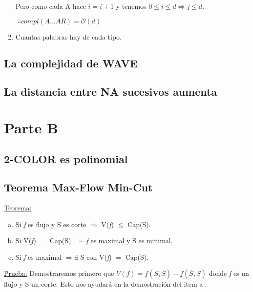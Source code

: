 \documentclass[12pt,a4paper]{report}
\begin{document}
\begin{enumerate}
		Pero como cada A hace $ i = i+1$ y tenemos $ 0 \leq \textit{i} \leq \textit{d} \Rightarrow \textit{j} \leq \textit{d}.$
		
		\begin{center}
			$ \; \therefore compl(A...AR) = \mathcal{O}(\textit{d})$
		\end{center}			
			

			\item Cuantas palabras hay de cada tipo.
			
				
		\end{enumerate}
		
		
		
		
		
		
		
	\section{La complejidad de WAVE}

	
	\section{La distancia entre NA sucesivos aumenta}
	


\chapter{Parte B}

	\section{2-COLOR es polinomial}
	
	
	\section{Teorema Max-Flow Min-Cut}
		\underline{Teorema:}
		\begin{enumerate}[a)]
			\item Si \textit{f} es flujo y S es corte $\Rightarrow$ V(\textit{f}) $\leq$ Cap(S).
			\item Si V(\textit{f}) $=$ Cap(S) $\Rightarrow$ \textit{f} es maximal y S es minimal.
			\item Si \textit{f} es maximal $\Rightarrow \exists$ S con V(\textit{f}) $=$ Cap(S).
		\end{enumerate}
		
		\underline{Prueba:} Demostraremos primero que $V(\textit{f}) = f(S, \overline{S}) - f(\overline{S},S)$ donde \textit{f} es un flujo y S un corte. Esto nos ayudará en la demostración del ítem \textcircled{a}.
		
\end{document}
